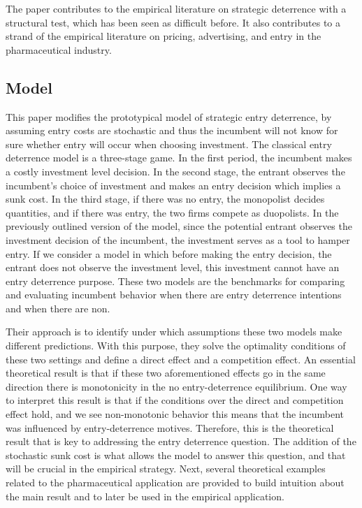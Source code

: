 \documentclass{article}
\theoremstyle{definition}
\begin{document}
The paper contributes to the empirical literature on strategic deterrence with a structural test, which has been seen as difficult before. It also contributes to a strand of the empirical literature on pricing, advertising, and entry in the pharmaceutical industry. 


\subsection*{Model}

This paper modifies the prototypical model of strategic entry deterrence, by assuming entry costs are stochastic and thus the incumbent will not know for sure whether entry will occur when choosing investment. The classical entry deterrence model is a three-stage game. In the first period, the incumbent makes a costly investment level decision. In the second stage, the entrant observes the incumbent's choice of investment and makes an entry decision which implies a sunk cost. In the third stage, if there was no entry, the monopolist decides quantities, and if there was entry, the two firms compete as duopolists. In the previously outlined version of the model, since the potential entrant observes the investment decision of the incumbent, the investment serves as a tool to hamper entry. If we consider a model in which before making the entry decision, the entrant does not observe the investment level, this investment cannot have an entry deterrence purpose. These two models are the benchmarks for comparing and evaluating incumbent behavior when there are entry deterrence intentions and when there are non.

Their approach is to identify under which assumptions these two models make different predictions. With this purpose, they solve the optimality conditions of these two settings and define a direct effect and a competition effect. An essential theoretical result is that if these two aforementioned effects go in the same direction there is monotonicity in the no entry-deterrence equilibrium. One way to interpret this result is that if the conditions over the direct and competition effect hold, and we see non-monotonic behavior this means that the incumbent was influenced by entry-deterrence motives. Therefore, this is the theoretical result that is key to addressing the entry deterrence question. The addition of the stochastic sunk cost is what allows the model to answer this question, and that will be crucial in the empirical strategy. Next, several theoretical examples related to the pharmaceutical application are provided to build intuition about the main result and to later be used in the empirical application. 
\end{document}
